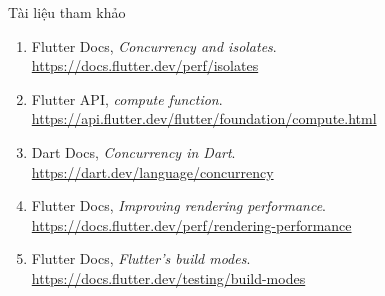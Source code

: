 \documentclass[aspectratio=169,11pt]{beamer}
\begin{document}
\appendix

\begin{frame}{Tài liệu tham khảo}
  \begin{enumerate}
    \setlength{\itemsep}{0.25cm}
    \item Flutter Docs, \textit{Concurrency and isolates}.\\
    \url{https://docs.flutter.dev/perf/isolates}
    \item Flutter API, \textit{compute function}.\\
    \url{https://api.flutter.dev/flutter/foundation/compute.html}
    \item Dart Docs, \textit{Concurrency in Dart}.\\
    \url{https://dart.dev/language/concurrency}
    \item Flutter Docs, \textit{Improving rendering performance}.\\
    \url{https://docs.flutter.dev/perf/rendering-performance}
    \item Flutter Docs, \textit{Flutter's build modes}.\\
    \url{https://docs.flutter.dev/testing/build-modes}
  \end{enumerate}
\end{frame}
\end{document}

